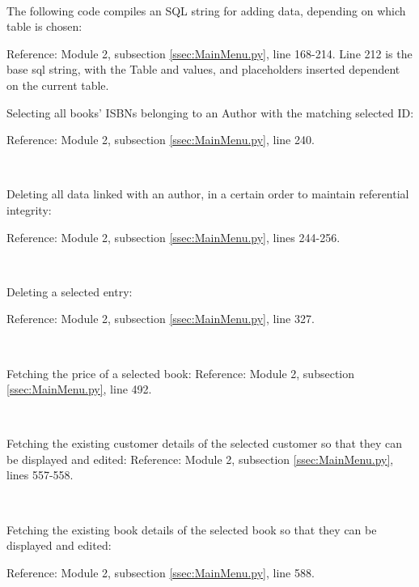 \

The following code compiles an SQL string for adding data, depending on which table is chosen:
\begin{tiny}
\end{tiny}
Reference: Module 2,  subsection \ref{ssec:MainMenu.py}, line 168-214.
Line 212 is the base sql string, with the Table and values, and placeholders inserted dependent on the current table.
\


Selecting all books' ISBNs belonging to an Author with the matching selected ID:
\begin{tiny}
\end{tiny}
Reference: Module 2,  subsection \ref{ssec:MainMenu.py}, line 240.

\

Deleting all data linked with an author, in a certain order to maintain referential integrity:
\begin{tiny}
\end{tiny}
Reference: Module 2,  subsection \ref{ssec:MainMenu.py}, lines 244-256.

\

Deleting a selected entry:
\begin{tiny}
\end{tiny}
Reference: Module 2,  subsection \ref{ssec:MainMenu.py}, line 327.

\

Fetching the price of a selected book:
Reference: Module 2,  subsection \ref{ssec:MainMenu.py}, line 492.

\

Fetching the existing customer details of the selected customer so that they can be displayed and edited:
Reference: Module 2,  subsection \ref{ssec:MainMenu.py}, lines 557-558.

\

Fetching the existing book details of the selected book so that they can be displayed and edited:
\begin{tiny}
\end{tiny}
Reference: Module 2,  subsection \ref{ssec:MainMenu.py}, line 588.

